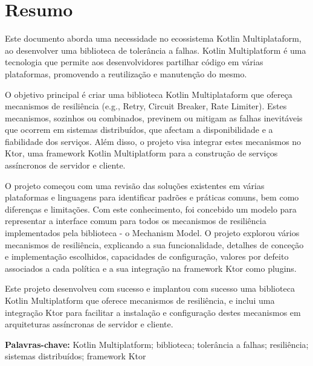 \chapter*{Resumo}\label{ch:resumo}

Este documento aborda uma necessidade no ecossistema Kotlin Multiplataform,
ao desenvolver uma biblioteca de tolerância a falhas.
Kotlin Multiplatform é uma tecnologia que permite aos desenvolvidores partilhar código em várias plataformas, promovendo a reutilização e manutenção do mesmo.

O objetivo principal é
criar uma biblioteca Kotlin Multiplataform
que ofereça mecanismos de resiliência (e.g., Retry, Circuit Breaker, Rate Limiter).
Estes mecanismos, sozinhos ou combinados, previnem ou mitigam as falhas inevitáveis que ocorrem em sistemas distribuídos,
que afectam a disponibilidade e a fiabilidade dos serviços.
Além disso, o projeto visa integrar estes mecanismos no Ktor,
uma framework Kotlin Multiplatform para a construção de serviços assíncronos de servidor e cliente.

O projeto começou com uma revisão das soluções existentes em várias plataformas e linguagens para identificar padrões e práticas comuns, bem como diferenças e limitações.
Com este conhecimento, foi concebido um modelo para representar a interface comum para todos os mecanismos de resiliência implementados pela biblioteca - o Mechanism Model.
O projeto explorou vários mecanismos de resiliência,
explicando a sua funcionalidade,
detalhes de conceção e implementação escolhidos, capacidades de configuração, valores por defeito associados a cada política e a sua integração na framework Ktor como plugins.

Este projeto desenvolveu com sucesso
e implantou
com sucesso uma biblioteca Kotlin Multiplatform que oferece mecanismos de resiliência,
e inclui uma integração Ktor para facilitar a instalação e configuração destes mecanismos em arquiteturas assíncronas de servidor e cliente.


\textbf{Palavras-chave:} Kotlin Multiplatform; biblioteca; tolerância a falhas; resiliência; sistemas distribuídos; framework Ktor
